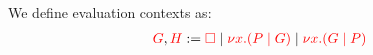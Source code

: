 \begin{definition}\label{def:cp-evaluation-contexts}
  We define evaluation contexts as:
  \begin{align*}
    \textcolor{red}{G}, \textcolor{red}{H}
    := \textcolor{red}{\Box}
    \mid \textcolor{red}{\nu x.(P \mid G)}
    \mid \textcolor{red}{\nu x.(G \mid P)}
  \end{align*}
\end{definition}

